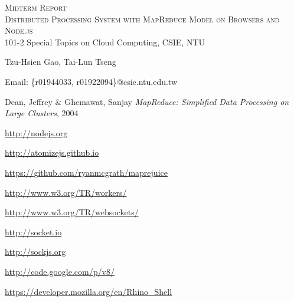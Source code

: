 \documentclass[a4paper, 10pt]{report}
\begin{document}

\begin{center}
\begin{spacing}{2}
\textsc{\LARGE Midterm Report}\\[1.5cm]
\textsc{\LARGE Distributed Processing System with MapReduce Model on Browsers and Node.js}\\[2cm]
101-2 Special Topics on Cloud Computing, CSIE, NTU

Tzu-Hsien Gao, Tai-Lun Tseng

Email: \{r01944033, r01922094\}@csie.ntu.edu.tw
\end{spacing}
\end{center}








\begin{thebibliography}{9}

Dean, Jeffrey \& Ghemawat, Sanjay
\emph{MapReduce: Simplified Data Processing on Large Clusters},
2004

\url{http://nodejs.org}

\url{http://atomizejs.github.io}

\url{https://github.com/ryanmcgrath/maprejuice}

\url{http://www.w3.org/TR/workers/}

\url{http://www.w3.org/TR/websockets/}

\url{http://socket.io}

\url{http://sockjs.org}

\url{http://code.google.com/p/v8/}

\url{https://developer.mozilla.org/en/Rhino_Shell}

\end{thebibliography}
\end{document}
